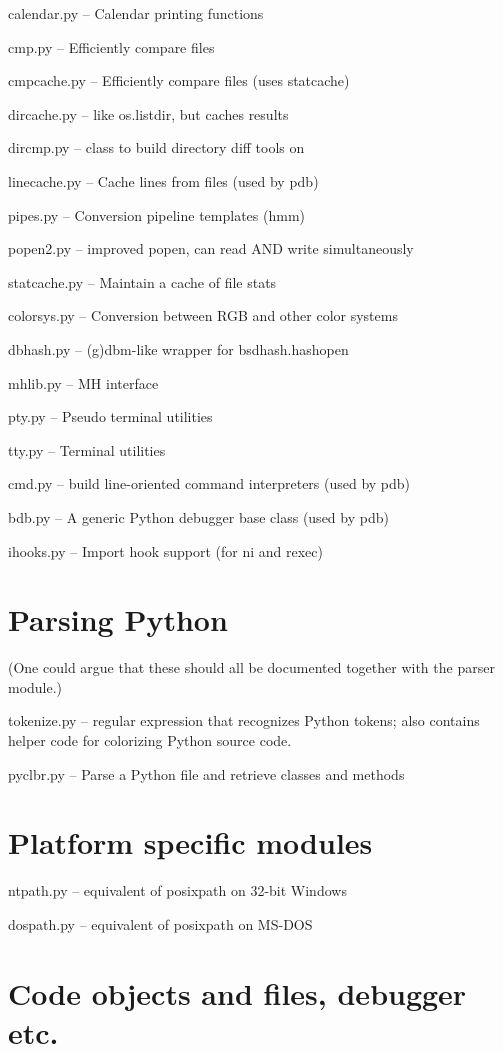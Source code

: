 calendar.py -- Calendar printing functions

cmp.py -- Efficiently compare files

cmpcache.py -- Efficiently compare files (uses statcache)

dircache.py -- like os.listdir, but caches results

dircmp.py -- class to build directory diff tools on

linecache.py -- Cache lines from files (used by pdb)

pipes.py -- Conversion pipeline templates (hmm)

popen2.py -- improved popen, can read AND write simultaneously

statcache.py -- Maintain a cache of file stats

colorsys.py -- Conversion between RGB and other color systems

dbhash.py -- (g)dbm-like wrapper for bsdhash.hashopen

mhlib.py -- MH interface

pty.py -- Pseudo terminal utilities

tty.py -- Terminal utilities

cmd.py -- build line-oriented command interpreters (used by pdb)

bdb.py -- A generic Python debugger base class (used by pdb)

ihooks.py -- Import hook support (for ni and rexec)


\section{Parsing Python}

(One could argue that these should all be documented together with the
parser module.)

tokenize.py -- regular expression that recognizes Python tokens; also
contains helper code for colorizing Python source code.

pyclbr.py -- Parse a Python file and retrieve classes and methods


\section{Platform specific modules}

ntpath.py -- equivalent of posixpath on 32-bit Windows

dospath.py -- equivalent of posixpath on MS-DOS


\section{Code objects and files, debugger etc.}


